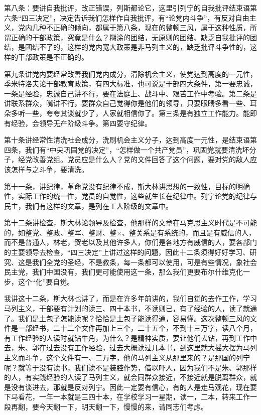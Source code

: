 第八条：要讲自我批评，改正错误，列斯都论它，这里引列宁的自我批评结束语第六条“四三决定”，决定告诉我们怎样作自我批评，有“论党内斗争”，有反对自由主义，党内几种不正确的倾向，都属于第八条，现在的整顿三风，属于这种性质，所谓正确的干部政策，究竟是什么？糊涂的团结，无原则的团结、缺乏自我批评的团结，是团结不了的，这样的党内宽大政策是非马列主义的，缺乏批评斗争性的，这样的干部政策是不正确的。

第九条讲党内要经常改善我们党内成分，清除机会主义，使党达到高度的一元性，季米特洛夫论干部教育政策，有四大标准，也可说是干部四大条件，第一要忠诚，一条是经验，忠诚自己讲不行，要在法庭上、战斗中、艰苦工作中考验。第二条是讲联系群众，嘴讲不行，要群众自己觉得你是他们的领导，只要眼睛多看一些、耳朵多听一些，夸夸其谈就少了，人家就相信你了。第三条是有独立工作能力。能即有经验，会领导无产阶级斗争。第四要守纪律。

第十条讲经常性清洗社会成分，洗刷机会主义分子，达到高度一元性，是结束语第四条，我们有“中央巩固党的决定”，“怎样做一个共产党员”，巩固党就要清洗坏分子，经党改善党组。党员应是什么人？党的文件回答了这个问题，要对党的敌人应该怎样与之斗争，要清洗。

第十一条，讲纪律，革命党没有纪律不成，斯大林讲思想的一致性，目标的明确性，实际工作的统一性，党员的自觉性，这些就生长在纪律中。列宁论党的纪律与民主，我们有这样的文章，是列在工人阶级的文章中。

第十二条讲检查，斯大林论领导及检查，他那样的文章在马克思主义时代是不可能的，如整党、整政、整军、整财、整×、整关系是有系统的，而且是有威信的人，而不是普通人，林老，贺老以及其他许多人，你们是各地方有威信的人，要各部门的主要领导去检查，“四三决定”上讲过这样的问题，因此十二条须得好好学习、研究、这是我们全党的圣经，不是教条，每一条都可以使用，可是有些情况，象社会民主党，我们中国没有，我们更可能使用这一条，那么我们更要布尔什维克化一步，这个“化”要自觉。

我讲这十二条，斯大林也讲了，而是在许多年前讲的，我们自觉的去作工作，学习马列主义，干部要有计划的读三、四十本书，不读则已，有了经验的人，读了就通了。我们是土包子怎能读呢？恰恰是土包子能读得通，容易懂。这次整顿三风的文件是一部经书，二十二个文件再加上三个，二十五个，不到十三万字，读八个月，有工作经验的人读时就钻牛角，为什么？是精神实质，要让他们去钻，再到工作中去，朱、郭在过去没有工作经验，过去大概读过几本书，到这里就大摇大摆为马列主义而斗争，这个文件有一、二万字，他的马列主义从那里来的？是那国的列宁呢？就等于没有读书，我们读不是装腔作势，借以吓人，因为我们不是朱、郭那样的人，有实践经验的人读了马列主义，就会同群众接近，不接近就是脱离群众，就是没有谈进去，那就是反对列宁。因此一定要有信心，有的人是走马观花，现在要下马看花，一年一本就是三四十本，在学校学习一星期，读一，二本，转来工作一段再翻，要今天翻一下，明天翻一下，慢慢的来，请同志们考虑。


